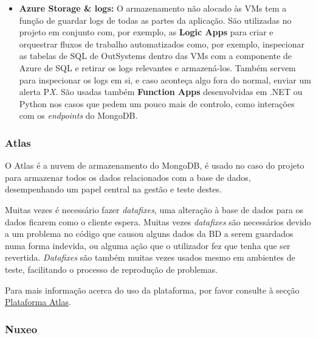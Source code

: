 \begin{itemize}
            \item \textbf{Azure Storage \& logs:} O armazenamento não alocado às VMs tem a função de guardar logs de todas as partes da aplicação. São utilizadas no projeto em conjunto com, por exemplo, as \textbf{Logic Apps} para criar e orquestrar fluxos de trabalho automatizados como, por exemplo, inspecionar as tabelas de SQL de OutSystems dentro das VMs com a componente de Azure de SQL e retirar os logs relevantes e armazená-los. Também servem para inspecionar os logs em si, e caso aconteça algo fora do normal, enviar um alerta P\textit{X}. São usadas também \textbf{Function Apps} desenvolvidas em .NET ou Python nos casos que pedem um pouco mais de controlo, como interações com os \textit{endpoints} do MongoDB.
            
        \end{itemize}
        
        \subsubsection{Atlas}\label{secsec:atlas}
        
            O Atlas é a nuvem de armazenamento do MongoDB, é usado no caso do projeto para armazenar todos os dados relacionados com a base de dados, desempenhando um papel central na gestão e teste destes. 

            Muitas vezes é necessário fazer \textit{datafixes}, uma alteração à base de dados para os dados ficarem como o cliente espera. Muitas vezes \textit{datafixes} são necessários devido a um problema no código que causou alguns dados da BD a serem guardados numa forma indevida, ou alguma ação que o utilizador fez que tenha que ser revertida. \textit{Datafixes} são também muitas vezes usados mesmo em ambientes de teste, facilitando o processo de reprodução de problemas.

            Para mais informação acerca do uso da plataforma, por favor consulte à secção \hyperref[sec:ferramentas-atlas]{Plataforma Atlas}.

        \subsubsection{Nuxeo}\label{secsec:nuxio}
        
